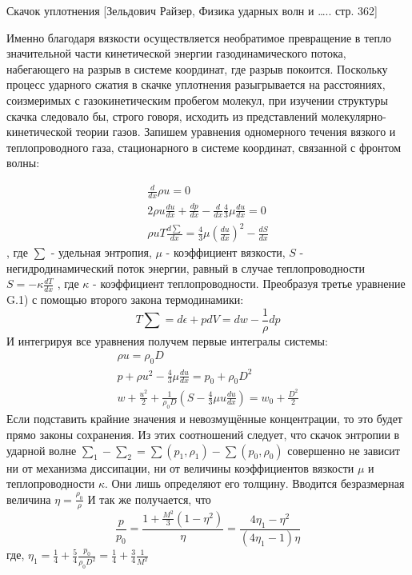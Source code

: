 \documentclass[10pt, a4paper]{article}
\begin{document}
Скачок уплотнения [Зельдович Райзер, Физика ударных волн и ….. стр. 362]


Именно благодаря вязкости осуществляется необратимое превращение в тепло значительной части кинетической энергии газодинамического потока, набегающего на разрыв в системе координат, где разрыв покоится. 
Поскольку процесс ударного сжатия в скачке уплотнения разыгрывается на расстояниях, соизмеримых с газокинетическим пробегом молекул, при изучении структуры скачка следовало бы, строго говоря, исходить из представлений молекулярно-кинетической теории газов. 
Запишем уравнения одномерного течения вязкого и теплопроводного газа, стационарного в системе координат, связанной с фронтом волны: 

\begin{eqnarray}
	\frac{d}{dx} \rho u =0 \\
	2 \rho u \frac{du}{dx} + \frac{dp}{dx}-\frac{d}{dx} \frac{4}{3} \mu \frac{du}{dx} =0 \\
	 \rho uT \frac{d \sum}{dx}=\frac{4}{3} \mu (\frac{du}{dx})^{2} - \frac{dS}{dx}
\end{eqnarray}
, где $\sum$ - удельная энтропия, $\mu$  - коэффициент вязкости, $S$ - негидродинамический поток энергии, равный в случае теплопроводности $S=-\kappa \frac{dT}{dx}$ , где $\kappa$ - коэффициент теплопроводности.
Преобразуя третье уравнение G.1) с помощью второго закона термодинамики: 
\begin{equation}
	T \sum = d \epsilon + p dV = dw  - \frac{1}{\rho} dp 
\end{equation}
И интегрируя все уравнения получем первые интегралы системы:
\begin{eqnarray}
	\rho u = \rho_0 D \\  p+\rho u^{2} - \frac{4}{3} \mu \frac{du}{dx} = p_0 + \rho_0 D^{2} \\  w + \frac{u^{2}}{2} + \frac{1}{\rho_0 D} (S - \frac{4}{3} \mu u \frac{du}{dx}) = w_0 + \frac{D^{2}}{2}
\end{eqnarray}
Если подставить крайние значения и невозмущённые концентрации, то это будет прямо законы сохранения. 
Из этих соотношений следует, что скачок энтропии в ударной волне $\sum_1 - \sum_2 = \sum (p_1, \rho_1) - \sum (p_0, \rho_0)$  совершенно не зависит ни от механизма диссипации, ни от величины коэффициентов вязкости $\mu$ и теплопроводности $\kappa$. Они лишь определяют его толщину.
Вводится безразмерная величина $\eta = \frac{\rho_0}{\rho} $
И так же получается, что
\begin{equation}
	\frac{p}{p_0}=\frac{1 + \frac{M^{2}}{3} (1-\eta^{2})}{\eta}=\frac{4 \eta_1 - \eta^{2}}{(4 \eta_1 -1) \eta}
\end{equation}
где, $\eta_1 = \frac{1}{4}+\frac{5}{4} \frac{p_0}{\rho_0 D^{2}}=  \frac{1}{4} + \frac{3}{4} \frac{1}{M^{2}}$
\end{document}

